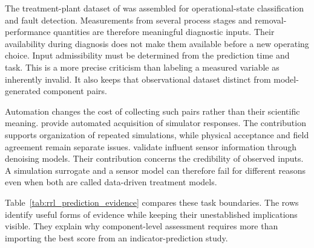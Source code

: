 The treatment-plant dataset of \citet{Poch1993} was assembled for operational-state classification and fault detection. Measurements from several process stages and removal-performance quantities are therefore meaningful diagnostic inputs. Their availability during diagnosis does not make them available before a new operating choice. Input admissibility must be determined from the prediction time and task. This is a more precise criticism than labeling a measured variable as inherently invalid. It also keeps that observational dataset distinct from model-generated component pairs.

Automation changes the cost of collecting such pairs rather than their scientific meaning. \citet{Caro2024} provide automated acquisition of simulator responses. The contribution supports organization of repeated simulations, while physical acceptance and field agreement remain separate issues. \citet{BaAlawi2021} validate influent sensor information through denoising models. Their contribution concerns the credibility of observed inputs. A simulation surrogate and a sensor model can therefore fail for different reasons even when both are called data-driven treatment models.

Table~\ref{tab:rrl_prediction_evidence} compares these task boundaries. The rows identify useful forms of evidence while keeping their unestablished implications visible. They explain why component-level assessment requires more than importing the best score from an indicator-prediction study.

